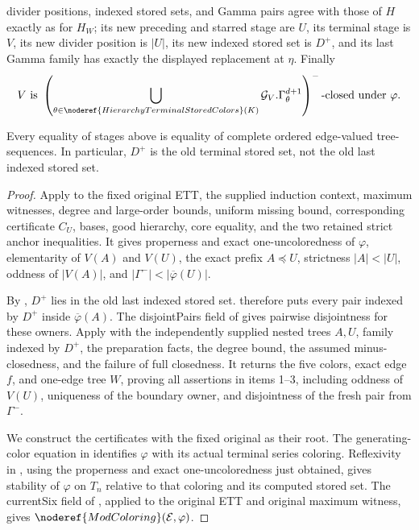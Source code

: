 \begin{theorem}
\begin{enumerate}
divider positions, indexed stored sets, and Gamma pairs agree with those
of $H$ exactly as for $H_W$; its new preceding and starred stage are
$U$, its terminal stage is $V$, its new divider position is $|U|$, its
new indexed stored set is $D^+$, and its last Gamma family has exactly
the displayed replacement at $\eta$.  Finally
\[
 V\text{ is }
 \left(\bigcup_{\theta\in
   \noderef{HierarchyTerminalStoredColors}(K)}
   \mathcal G_V.\Gamma^{d+1}_\theta\right)^-\text{-closed under }\varphi.
\]
\end{enumerate}
Every equality of stages above is equality of complete ordered
edge-valued tree-sequences.  In particular, $D^+$ is the old terminal
stored set, not the old last indexed stored set.
\end{theorem}
\begin{proof}
Apply  to the fixed original
ETT, the supplied induction context, maximum witnesses, degree and
large-order bounds, uniform missing bound, corresponding certificate
$C_U$, bases, good hierarchy, core equality, and the two retained strict
anchor inequalities. It gives properness and exact one-uncoloredness of
$\varphi$, elementarity of $V(A)$ and $V(U)$, the exact prefix
$A\preccurlyeq U$, strictness $|A|<|U|$, oddness of $|V(A)|$, and
$|\Gamma^-|<|\overline\varphi(U)|$.

By ,
$D^+$ lies in the old last indexed stored set.
 therefore puts every pair
indexed by $D^+$ inside $\overline\varphi(A)$. The disjointPairs field of
 gives pairwise disjointness for these owners.
Apply  with the independently
supplied nested trees $A,U$, family indexed by $D^+$, the preparation
facts, the degree bound, the assumed minus-closedness, and the failure
of full closedness. It returns the five colors, exact edge $f$, and
one-edge tree $W$, proving all assertions in items 1--3, including
oddness of $V(U)$, uniqueness of the boundary owner, and disjointness
of the fresh pair from $\Gamma^-$.

We construct the certificates with the fixed original as their root.
The generating-color equation in 
identifies $\varphi$ with its actual terminal series coloring.
Reflexivity in , using the properness and exact
one-uncoloredness just obtained, gives stability of $\varphi$ on
$T_n$ relative to that coloring and its computed stored set.
The currentSix field of , applied
to the original ETT and original maximum witness, gives
$\noderef{ModColoring}(\mathcal E,\varphi)$.


\end{proof}
